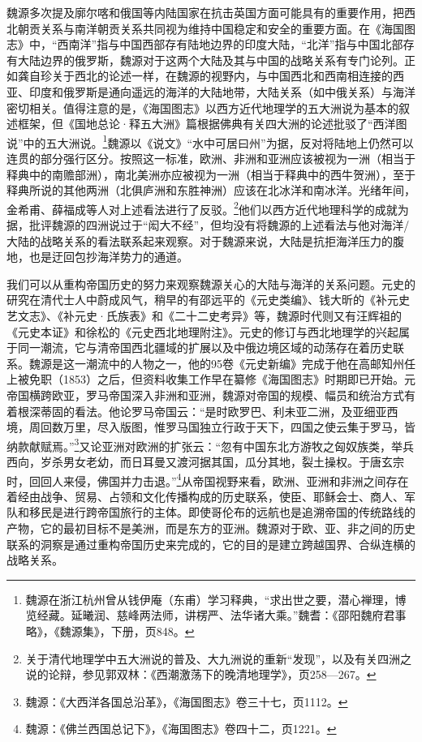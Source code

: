 \documentclass[a4paper, 12pt, openright]{ctexbook}
\begin{document}
魏源多次提及廓尔喀和俄国等内陆国家在抗击英国方面可能具有的重要作用，把西北朝贡关系与南洋朝贡关系共同视为维持中国稳定和安全的重要方面。在《海国图志》中，“西南洋”指与中国西部存有陆地边界的印度大陆，“北洋”指与中国北部存有大陆边界的俄罗斯，魏源对于这两个大陆及其与中国的战略关系有专门论列。正如龚自珍关于西北的论述一样，在魏源的视野内，与中国西北和西南相连接的西亚、印度和俄罗斯是通向遥远的海洋的大陆地带，大陆关系（如中俄关系）与海洋密切相关。值得注意的是，《海国图志》以西方近代地理学的五大洲说为基本的叙述框架，但《国地总论·释五大洲》篇根据佛典有关四大洲的论述批驳了“西洋图说”中的五大洲说。\footnote{魏源在浙江杭州曾从钱伊庵（东甫）学习释典，“求出世之要，潜心禅理，博览经藏。延曦润、慈峰两法师，讲楞严、法华诸大乘。”魏耆：《邵阳魏府君事略》，《魏源集》，下册，页848。}魏源以《说文》“水中可居曰州”为据，反对将陆地上仍然可以连贯的部分强行区分。按照这一标准，欧洲、非洲和亚洲应该被视为一洲（相当于释典中的南赡部洲），南北美洲亦应被视为一洲（相当于释典中的西牛贺洲），至于释典所说的其他两洲（北俱庐洲和东胜神洲）应该在北冰洋和南冰洋。光绪年间，金希甫、薛福成等人对上述看法进行了反驳。\footnote{关于清代地理学中五大洲说的普及、大九洲说的重新“发现”，以及有关四洲之说的论辩，参见郭双林：《西潮激荡下的晚清地理学》，页258—267。}他们以西方近代地理科学的成就为据，批评魏源的四洲说过于“闳大不经”，但均没有将魏源的上述看法与他对海洋/大陆的战略关系的看法联系起来观察。对于魏源来说，大陆是抗拒海洋压力的腹地，也是迂回包抄海洋势力的通道。

我们可以从重构帝国历史的努力来观察魏源关心的大陆与海洋的关系问题。元史的研究在清代士人中蔚成风气，稍早的有邵远平的《元史类编》、钱大昕的《补元史艺文志》、《补元史·氏族表》和《二十二史考异》等，魏源时代则又有汪辉祖的《元史本证》和徐松的《元史西北地理附注》。元史的修订与西北地理学的兴起属于同一潮流，它与清帝国西北疆域的扩展以及中俄边境区域的动荡存在着历史联系。魏源是这一潮流中的人物之一，他的95卷《元史新编》完成于他在高邮知州任上被免职（1853）之后，但资料收集工作早在纂修《海国图志》时期即已开始。元帝国横跨欧亚，罗马帝国深入非洲和亚洲，魏源对帝国的规模、幅员和统治方式有着根深蒂固的看法。他论罗马帝国云：“是时欧罗巴、利未亚二洲，及亚细亚西境，周回数万里，尽入版图，惟罗马国独立行政于天下，四国之使云集于罗马，皆纳款献赋焉。”\footnote{魏源：《大西洋各国总沿革》，《海国图志》卷三十七，页1112。}又论亚洲对欧洲的扩张云：“忽有中国东北方游牧之匈奴族类，举兵西向，岁杀男女老幼，而日耳曼又渡河据其国，瓜分其地，裂土操权。于唐玄宗时，回回人来侵，佛国并力击退。”\footnote{魏源：《佛兰西国总记下》，《海国图志》卷四十二，页1221。}从帝国视野来看，欧洲、亚洲和非洲之间存在着经由战争、贸易、占领和文化传播构成的历史联系，使臣、耶稣会士、商人、军队和移民是进行跨帝国旅行的主体。即使哥伦布的远航也是追溯帝国的传统路线的产物，它的最初目标不是美洲，而是东方的亚洲。魏源对于欧、亚、非之间的历史联系的洞察是通过重构帝国历史来完成的，它的目的是建立跨越国界、合纵连横的战略关系。
\end{document}
